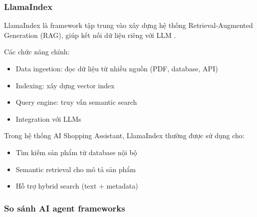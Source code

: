\subsubsection{LlamaIndex}

LlamaIndex là framework tập trung vào xây dựng hệ thống Retrieval-Augmented Generation (RAG), giúp kết nối dữ liệu riêng với LLM \parencite{llamaindex2024docs}.

Các chức năng chính:
\begin{itemize}
    \item Data ingestion: đọc dữ liệu từ nhiều nguồn (PDF, database, API)
    \item Indexing: xây dựng vector index
    \item Query engine: truy vấn semantic search
    \item Integration với LLMs
\end{itemize}

Trong hệ thống AI Shopping Assistant, LlamaIndex thường được sử dụng cho:
\begin{itemize}
    \item Tìm kiếm sản phẩm từ database nội bộ
    \item Semantic retrieval cho mô tả sản phẩm
    \item Hỗ trợ hybrid search (text + metadata)
\end{itemize}


\subsubsection{So sánh AI agent frameworks}

